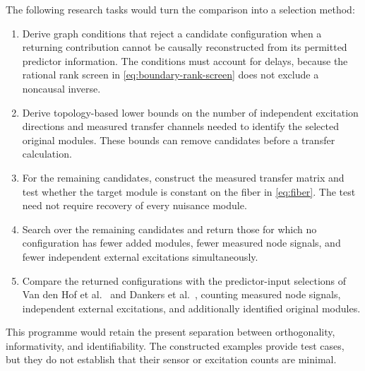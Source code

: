 \documentclass[11pt,a4paper]{article}
\begin{document}
The following research tasks would turn the comparison into a selection method:
\begin{enumerate}
  \item Derive graph conditions that reject a candidate configuration when a returning contribution cannot be causally reconstructed from its permitted predictor information.  The conditions must account for delays, because the rational rank screen in \eqref{eq:boundary-rank-screen} does not exclude a noncausal inverse.
  \item Derive topology-based lower bounds on the number of independent excitation directions and measured transfer channels needed to identify the selected original modules.  These bounds can remove candidates before a transfer calculation.
  \item For the remaining candidates, construct the measured transfer matrix and test whether the target module is constant on the fiber in \eqref{eq:fiber}.  The test need not require recovery of every nuisance module.
  \item Search over the remaining candidates and return those for which no configuration has fewer added modules, fewer measured node signals, and fewer independent external excitations simultaneously.
  \item Compare the returned configurations with the predictor-input selections of Van den Hof et al.\ \cite{VandenHof2013} and Dankers et al.\ \cite{Dankers2016}, counting measured node signals, independent external excitations, and additionally identified original modules.
\end{enumerate}

This programme would retain the present separation between orthogonality, informativity, and identifiability.  The constructed examples provide test cases, but they do not establish that their sensor or excitation counts are minimal.
\end{document}
